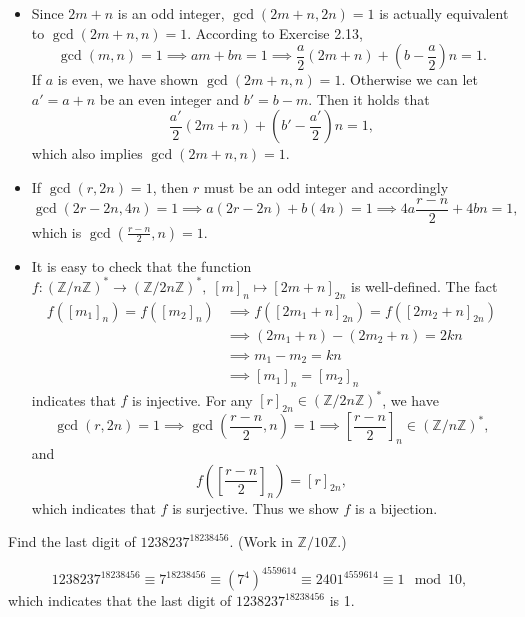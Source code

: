 \documentclass[12pt,letterpaper,boxed]{hmcpset}
\begin{document}
\begin{solution}
	\begin{itemize}
		\item Since $2m+n$ is an odd integer, $\gcd(2m+ n, 2n) = 1$ is actually equivalent to $\gcd(2m+ n, n) = 1$. According to Exercise 2.13,
		\[
		\gcd(m, n) = 1\implies am+bn=1\implies \frac{a}{2}(2m+n)+\left(b-\frac{a}{2}\right)n=1.
		\]
		If $a$ is even, we have shown $\gcd(2m+ n, n) = 1$. Otherwise we can let $a'=a+n$ be an even integer and $b'=b-m$. Then it holds that
		\[
		\frac{a'}{2}(2m+n)+\left(b'-\frac{a'}{2}\right)n=1,
		\]
		which also implies $\gcd(2m+ n, n) = 1$.
		\item If $\gcd(r, 2n) = 1$, then $r$ must be an odd integer and accordingly
		\[
		\gcd(2r-2n, 4n) = 1\implies a(2r-2n)+b(4n)=1\implies 4a \frac{r-n}{2}+4bn=1,
		\]
		which is $\gcd(\frac{r-n}{2}, n) = 1$.
		\item It is easy to check that the function $f:(\mathbb{Z}/n\mathbb{Z})^*\rightarrow(\mathbb{Z}/2n\mathbb{Z})^*,\;[m]_n\mapsto[2m + n]_{2n}$ is well-defined. The fact
		\[
		\begin{aligned}
		f([m_1]_n)=f([m_2]_n)&\implies
		f([2m_1 + n]_{2n})=f([2m_2 + n]_{2n})\\
		&\implies (2m_1 + n)-(2m_2 + n)=2kn\\
		&\implies m_1-m_2=kn\\
		&\implies [m_1]_n=[m_2]_n
		\end{aligned}
		\]
		indicates that $f$ is injective. For any $[r]_{2n}\in(\mathbb{Z}/2n\mathbb{Z})^*$, we have
		\[
		\gcd(r, 2n) = 1\implies\gcd\left(\frac{r-n}{2},n\right) = 1\implies \left[\frac{r-n}{2}\right]_n\in(\mathbb{Z}/n\mathbb{Z})^*,
		\]
		and
		\[
		f\left(\left[\frac{r-n}{2}\right]_n\right)=[r]_{2n},
		\]
		which indicates that $f$ is surjective. Thus we show $f$ is a bijection.
	\end{itemize}
\end{solution}



\begin{problem}[2.16]	
	Find the last digit of $1238237^{18238456}$. (Work in $\mathbb{Z}/10\mathbb{Z}$.)
\end{problem}
\begin{solution}
	\[
	1238237^{18238456}\equiv7^{18238456}\equiv(7^4)^{4559614}\equiv2401^{4559614} \equiv 1 \mod 10,
	\]
	which indicates that the last digit of $1238237^{18238456}$ is 1.
\end{solution}
\end{document}
